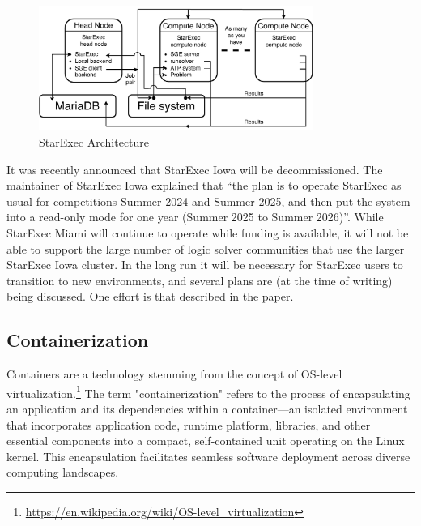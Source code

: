 \documentclass{easychair}
\begin{document}
\begin{figure}[htb]
\begin{center}
\includegraphics[width=0.8\textwidth]{ArchitectureS}
\caption{StarExec Architecture}
\label{ArchitectureS}
\end{center}
\end{figure}

It was recently announced that StarExec Iowa will be decommissioned. 
The maintainer of StarExec Iowa explained that ``the plan is to operate StarExec as usual for 
competitions Summer 2024 and Summer 2025, and then put the system into a read-only mode for one 
year (Summer 2025 to Summer 2026)''.
While StarExec Miami will continue to operate while funding is available, it will not be able
to support the large number of logic solver communities that use the larger StarExec Iowa cluster.
In the long run it will be necessary for StarExec users to transition to new environments,
and several plans are (at the time of writing) being discussed.
One effort is that described in the paper.

\subsection{Containerization}
\label{Containerization}

Containers are a technology stemming from the concept of OS-level virtualization.\footnote{\url{https://en.wikipedia.org/wiki/OS-level_virtualization}} The term "containerization" refers to the process of encapsulating an application and its dependencies within a container—an isolated environment that incorporates application code, runtime platform, libraries, and other essential components into a compact, self-contained unit operating on the Linux kernel. This encapsulation facilitates seamless software deployment across diverse computing landscapes.
\end{document}
